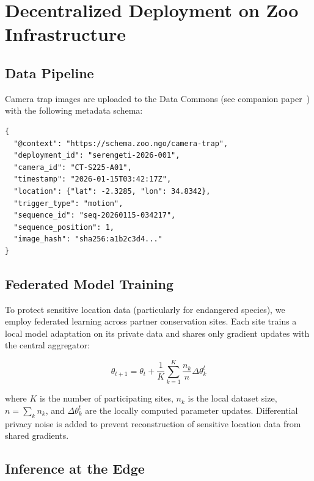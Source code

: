 \section{Decentralized Deployment on Zoo Infrastructure}


\subsection{Data Pipeline}

Camera trap images are uploaded to the \Zoo{} Data Commons (see companion paper~\cite{zoo2026commons}) with the following metadata schema:

\begin{lstlisting}[basicstyle=\footnotesize\ttfamily, frame=single, caption={Camera trap metadata schema (JSON-LD).}]
{
  "@context": "https://schema.zoo.ngo/camera-trap",
  "deployment_id": "serengeti-2026-001",
  "camera_id": "CT-S225-A01",
  "timestamp": "2026-01-15T03:42:17Z",
  "location": {"lat": -2.3285, "lon": 34.8342},
  "trigger_type": "motion",
  "sequence_id": "seq-20260115-034217",
  "sequence_position": 1,
  "image_hash": "sha256:a1b2c3d4..."
}
\end{lstlisting}

\subsection{Federated Model Training}

To protect sensitive location data (particularly for endangered species), we employ federated learning across partner conservation sites. Each site trains a local model adaptation on its private data and shares only gradient updates with the central aggregator:

\begin{equation}
\theta_{t+1} = \theta_t + \frac{1}{K} \sum_{k=1}^{K} \frac{n_k}{n} \Delta \theta_k^t
\end{equation}

where $K$ is the number of participating sites, $n_k$ is the local dataset size, $n = \sum_k n_k$, and $\Delta \theta_k^t$ are the locally computed parameter updates. Differential privacy noise is added to prevent reconstruction of sensitive location data from shared gradients.

\subsection{Inference at the Edge}

